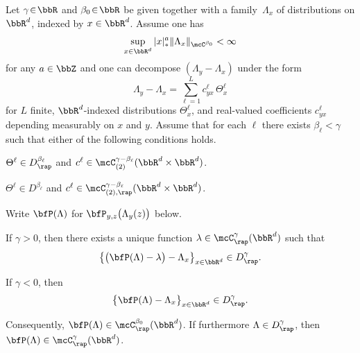 \begin{prop}[{\cite[Prop.\,9]{BH}}] \label{prop:reconstruction}
Let $\gamma\!\in\!\bbR$ and $\beta_0\!\in\!\bbR$ be given together with a fam\-ily~$\Lambda_x$ of distributions on $\bbR^d$, indexed by $x\in\bbR^d$. Assume one has
\[
\sup_{x\in\bbR^d}|x|_*^a\|\Lambda_x\|_{\mcC^{\beta_0}}< \infty
\]
for any $a\in\bbZ$ and one can decompose $(\Lambda_y - \Lambda_x)$ under the form
\begin{equation*}
\Lambda_y - \Lambda_x = \sum_{\ell=1}^L c^\ell_{yx}\,\Theta_x^\ell
\end{equation*}
for $L$ finite, $\bbR^d$-indexed distributions $\Theta_x^\ell$, and real-valued coefficients $c_{yx}^\ell$ depending measurably on $x$ and $y$.
Assume that for each $\ell$ there exists $\beta_\ell<\gamma$ such that either of the following conditions holds.
\begin{enumeratea}
\item\label{prop:reconstructiona} $\Theta^\ell\in D_{\rap}^{\beta_\ell}$ and $c^\ell\in\mcC_{(2)}^{\gamma-\beta_\ell}(\bbR^d\times\bbR^d)$.
\item\label{prop:reconstructionb} $\Theta^\ell\in D^{\beta_\ell}$ and $c^\ell\in\mcC_{(2),\rap}^{\gamma-\beta_\ell}(\bbR^d\times\bbR^d)$.
\end{enumeratea}

\noindent Write ${\bfP}(\Lambda)$ for ${\bfP}_{y,z}\bigl(\Lambda_y(z)\bigr)$ below.

\begin{enumeratei}
\item If $\gamma>0$, then there exists a unique function $\lambda\in \mcC_{\rap}^\gamma(\bbR^d)$ such that
\[
\big\{\bigl(\bfP(\Lambda)-\lambda\bigr) - \Lambda_x\big\}_{x\in\bbR^d}\in D_\rap^\gamma.
\]
\item If $\gamma<0$, then
\[
\big\{\bfP(\Lambda)-\Lambda_x\big\}_{x\in\bbR^d}\in D_\rap^\gamma.
\]
\end{enumeratei}
Consequently, $\bfP(\Lambda)\in \mcC_\rap^{\beta_0}(\bbR^d)$. If furthermore $\Lambda\in D_\rap^\gamma$, then $\bfP(\Lambda)\in \mcC_\rap^\gamma(\bbR^d)$.
\end{prop}

